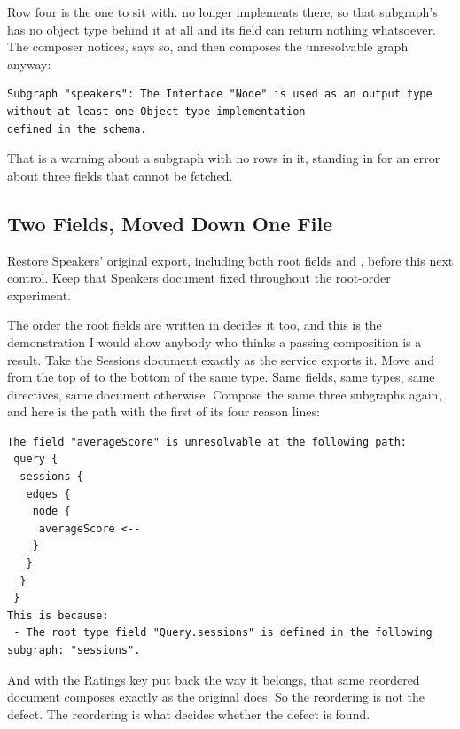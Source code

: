 %
Row four is the one to sit with.  no longer implements
 there, so that subgraph's  has no object type behind it
at all and its  field can return nothing whatsoever. The composer
notices, says so, and then composes the unresolvable graph anyway:

\begin{verbatim}
Subgraph "speakers": The Interface "Node" is used as an output type without at least one Object type implementation
defined in the schema.
\end{verbatim}

%
That is a warning about a subgraph with no rows in it, standing in for an error
about three fields that cannot be fetched.

\subsection{Two Fields, Moved Down One File}

%
Restore Speakers' original export, including both root fields and
, before this next control. Keep that
Speakers document fixed throughout the root-order experiment.

The order the root fields are written in decides it too, and this is the
demonstration I would show anybody who thinks a passing composition is a
result. Take the Sessions document exactly as the service exports it. Move
 and  from the top of  to the bottom of
the same type. Same fields, same types, same directives, same document
otherwise. Compose the same three subgraphs again, and here is the path with
the first of its four reason lines:

\begin{verbatim}
The field "averageScore" is unresolvable at the following path:
 query {
  sessions {
   edges {
    node {
     averageScore <--
    }
   }
  }
 }
This is because:
 - The root type field "Query.sessions" is defined in the following subgraph: "sessions".
\end{verbatim}

%
And with the Ratings key put back the way it belongs, that same reordered
document composes exactly as the original does. So the reordering is not the
defect. The reordering is what decides whether the defect is found.

